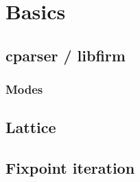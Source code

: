 \chapter{Basics}\label{sec:basics}

\section{cparser / libfirm}
\subsection{Modes}
\section{Lattice}
\section{Fixpoint iteration}
